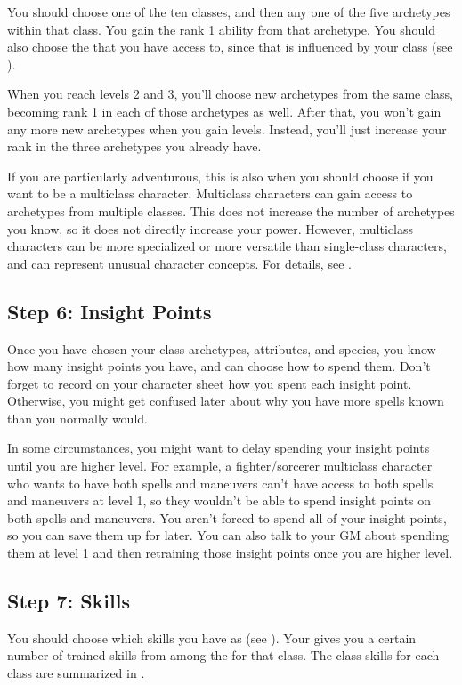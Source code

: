         You should choose one of the ten classes, and then any one of the five archetypes within that class.
        You gain the rank 1 ability from that archetype.
        You should also choose the  that you have access to, since that is influenced by your class (see ).

        When you reach levels 2 and 3, you'll choose new archetypes from the same class, becoming rank 1 in each of those archetypes as well.
        After that, you won't gain any more new archetypes when you gain levels.
        Instead, you'll just increase your rank in the three archetypes you already have.

        If you are particularly adventurous, this is also when you should choose if you want to be a multiclass character.
        Multiclass characters can gain access to archetypes from multiple classes.
        This does not increase the number of archetypes you know, so it does not directly increase your power.
        However, multiclass characters can be more specialized or more versatile than single-class characters, and can represent unusual character concepts.
        For details, see .

    \subsection{Step 6: Insight Points}
        Once you have chosen your class archetypes, attributes, and species, you know how many insight points you have, and can choose how to spend them.
        Don't forget to record on your character sheet how you spent each insight point.
        Otherwise, you might get confused later about why you have more spells known than you normally would.

        In some circumstances, you might want to delay spending your insight points until you are higher level.
        For example, a fighter/sorcerer multiclass character who wants to have both spells and maneuvers can't have access to both spells and maneuvers at level 1, so they wouldn't be able to spend insight points on both spells and maneuvers.
        You aren't forced to spend all of your insight points, so you can save them up for later.
        You can also talk to your GM about spending them at level 1 and then retraining those insight points once you are higher level.

    \subsection{Step 7: Skills}
        You should choose which skills you have as  (see ).
        Your  gives you a certain number of trained skills from among the  for that class.
        The class skills for each class are summarized in .

